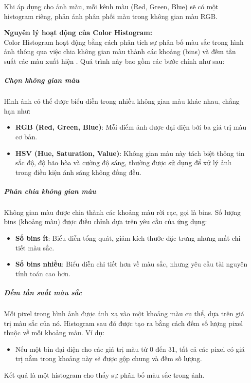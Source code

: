 \documentclass[a4paper,12pt]{article}
\begin{document}
Khi áp dụng cho ảnh màu, mỗi kênh màu (Red, Green, Blue) sẽ có một histogram riêng, phản ánh phân phối màu trong không gian màu RGB.

\vspace{0.5cm}
\noindent\textbf{Nguyên lý hoạt động của Color Histogram:} \\[0.15cm]
Color Histogram hoạt động bằng cách phân tích sự phân bố màu sắc trong hình ảnh thông qua việc chia không gian màu thành các khoảng (bins) và đếm tần suất các màu xuất hiện \cite{zilliz_color_histogram}. Quá trình này bao gồm các bước chính như sau:

\subparagraph{Chọn không gian màu}
\hspace{5mm}Hình ảnh có thể được biểu diễn trong nhiều không gian màu khác nhau, chẳng hạn như:
\begin{itemize}
    \item \textbf{RGB (Red, Green, Blue)}: Mỗi điểm ảnh được đại diện bởi ba giá trị màu cơ bản.
    \item \textbf{HSV (Hue, Saturation, Value)}: Không gian màu này tách biệt thông tin sắc độ, độ bão hòa và cường độ sáng, thường được sử dụng để xử lý ảnh trong điều kiện ánh sáng không đồng đều.
\end{itemize}

\subparagraph{Phân chia không gian màu}
\hspace{5mm}Không gian màu được chia thành các khoảng màu rời rạc, gọi là bins. Số lượng bins (khoảng màu) được điều chỉnh dựa trên yêu cầu của ứng dụng:
\begin{itemize}
    \item \textbf{Số bins ít}: Biểu diễn tổng quát, giảm kích thước đặc trưng nhưng mất chi tiết màu sắc.
    \item \textbf{Số bins nhiều}: Biểu diễn chi tiết hơn về màu sắc, nhưng yêu cầu tài nguyên tính toán cao hơn.
\end{itemize}

\subparagraph{Đếm tần suất màu sắc}
\hspace{5mm}Mỗi pixel trong hình ảnh được ánh xạ vào một khoảng màu cụ thể, dựa trên giá trị màu sắc của nó. Histogram sau đó được tạo ra bằng cách đếm số lượng pixel thuộc về mỗi khoảng màu. Ví dụ:
\begin{itemize}
    \item Nếu một bin đại diện cho các giá trị màu từ 0 đến 31, tất cả các pixel có giá trị nằm trong khoảng này sẽ được gộp chung và đếm số lượng.
\end{itemize}
\hspace{5mm}Kết quả là một histogram cho thấy sự phân bố màu sắc trong ảnh.
\end{document}
